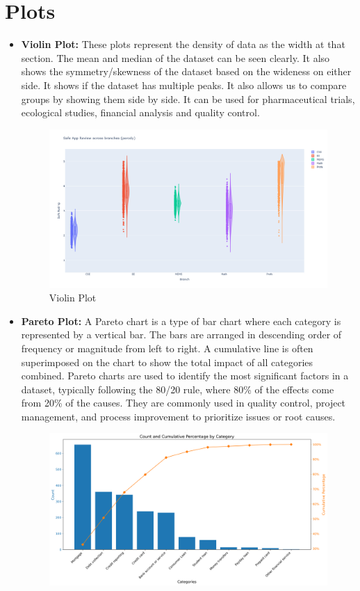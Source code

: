 \section{Plots}
\begin{itemize}
	\item \textbf{Violin Plot:} These plots represent the density of data as the width at that section. The mean and median of the dataset can be seen clearly. It also shows the symmetry/skewness of the dataset based on the wideness on either side. It shows if the dataset has multiple peaks. It also allows us to compare groups by showing them side by side. It can be used for pharmaceutical trials, ecological studies, financial analysis and quality control.
	      \begin{figure}[H]
		      \centering
		      \includegraphics[width=0.85\linewidth]{img/violin.png}
		      \caption{Violin Plot}
	      \end{figure}
	\item \textbf{Pareto Plot:} A Pareto chart is a type of bar chart where each category is represented by a vertical bar. The bars are arranged in descending order of frequency or magnitude from left to right. A cumulative line is often superimposed on the chart to show the total impact of all categories combined. Pareto charts are used to identify the most significant factors in a dataset, typically following the 80/20 rule, where 80\% of the effects come from 20\% of the causes. They are commonly used in quality control, project management, and process improvement to prioritize issues or root causes.
	      \begin{figure}[H]
		      \centering
		      \includegraphics[width=0.85\linewidth]{img/pareto.png}

\end{figure}
\end{itemize}
